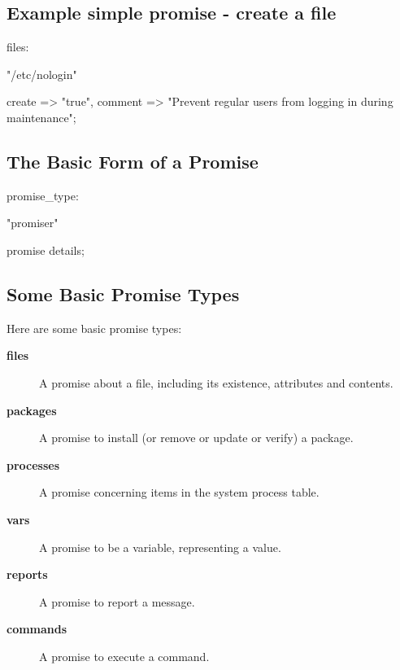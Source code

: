 \subsection{Example simple promise - create a file}

\begin{code}
files:

    "/etc/nologin" 

        create  => "true",
        comment => "Prevent regular users from logging in
                    during maintenance";
\end{code}





\subsection{The Basic Form of a Promise}

\begin{code}
promise_type:

       "promiser" 

            promise details;

\end{code}





\subsection{Some Basic Promise Types}

Here are some basic promise types:

\begin{description}
\item[\textbf{files}] A promise about a file, including its existence, attributes and contents.



\item[\textbf{packages}] A promise to install (or remove or update or verify) a package.



\item[\textbf{processes}] A promise concerning items in the system process table.



\item[\textbf{vars}] A promise to be a variable, representing a value.



\item[\textbf{reports}] A promise to report a message.



\item[\textbf{commands}] A promise to execute a command.
\end{description}





